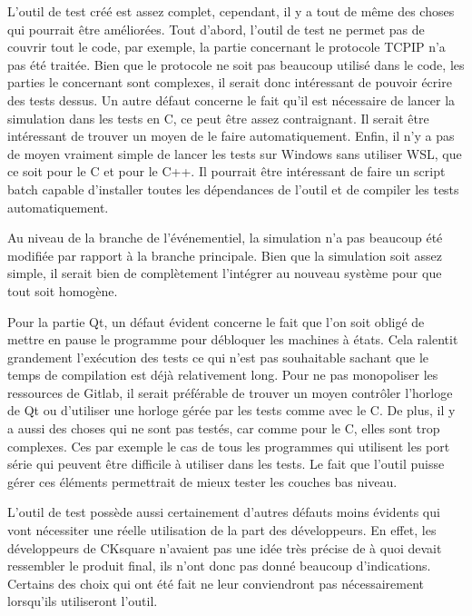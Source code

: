 \documentclass[a4paper]{article}
\begin{document}
L'outil de test créé est assez complet, cependant, il y a tout de même des
choses qui pourrait être améliorées. Tout d'abord, l'outil de test ne permet pas
de couvrir tout le code, par exemple, la partie concernant le protocole TCPIP
n'a pas été traitée. Bien que le protocole ne soit pas beaucoup utilisé dans le
code, les parties le concernant sont complexes, il serait donc intéressant de
pouvoir écrire des tests dessus. Un autre défaut concerne le fait qu'il est
nécessaire de lancer la simulation dans les tests en C, ce peut être assez
contraignant. Il serait être intéressant de trouver un moyen de le faire
automatiquement. Enfin, il n'y a pas de moyen vraiment simple de lancer les
tests sur Windows sans utiliser WSL, que ce soit pour le C et pour le C++. Il
pourrait être intéressant de faire un script batch capable d'installer toutes
les dépendances de l'outil et de compiler les tests automatiquement.

Au niveau de la branche de l'événementiel, la simulation n'a pas beaucoup été
modifiée par rapport à la branche principale. Bien que la simulation soit assez
simple, il serait bien de complètement l'intégrer au nouveau système pour que
tout soit homogène.

Pour la partie Qt, un défaut évident concerne le fait que l'on soit obligé de
mettre en pause le programme pour débloquer les machines à états. Cela ralentit
grandement l'exécution des tests ce qui n'est pas souhaitable sachant que le
temps de compilation est déjà relativement long. Pour ne pas monopoliser les
ressources de Gitlab, il serait préférable de trouver un moyen contrôler
l'horloge de Qt ou d'utiliser une horloge gérée par les tests comme avec le C.
De plus, il y a aussi des choses qui ne sont pas testés, car comme pour le C,
elles sont trop complexes. Ces par exemple le cas de tous les programmes qui
utilisent les port série qui peuvent être difficile à utiliser dans les tests.
Le fait que l'outil puisse gérer ces éléments permettrait de mieux tester les
couches bas niveau.

L'outil de test possède aussi certainement d'autres défauts moins évidents qui
vont nécessiter une réelle utilisation de la part des développeurs. En effet,
les développeurs de CKsquare n'avaient pas une idée très précise de à quoi
devait ressembler le produit final, ils n'ont donc pas donné beaucoup
d'indications. Certains des choix qui ont été fait ne leur conviendront pas
nécessairement lorsqu'ils utiliseront l'outil.\\
\end{document}
